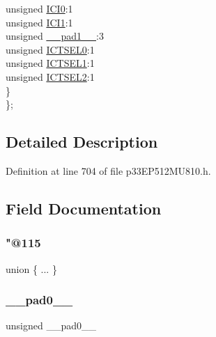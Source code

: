 \begin{DoxyCompactItemize}
\begin{tabbing}
\>\>unsigned \hyperlink{structtag_i_c4_c_o_n1_b_i_t_s_a6f1b5da2706b7c15fc8c9a01a30deaff}{ICI0}:1\\
\>\>unsigned \hyperlink{structtag_i_c4_c_o_n1_b_i_t_s_a7d5c777f0bc43f66f40462f79ed2179c}{ICI1}:1\\
\>\>unsigned \hyperlink{structtag_i_c4_c_o_n1_b_i_t_s_acaf2d0924a107ec6e8d2e31febaf66f9}{\_\_pad1\_\_}:3\\
\>\>unsigned \hyperlink{structtag_i_c4_c_o_n1_b_i_t_s_af6dd4d0e816b18462680d4b22fa926d3}{ICTSEL0}:1\\
\>\>unsigned \hyperlink{structtag_i_c4_c_o_n1_b_i_t_s_aa29140e739d886362537f87d199c4134}{ICTSEL1}:1\\
\>\>unsigned \hyperlink{structtag_i_c4_c_o_n1_b_i_t_s_a47d80892d449e6edbd5ba2ba9ff06deb}{ICTSEL2}:1\\
\>\} \\
\}; \\

\end{tabbing}\end{DoxyCompactItemize}


\subsection{Detailed Description}


Definition at line 704 of file p33\+E\+P512\+M\+U810.\+h.



\subsection{Field Documentation}
\mbox{\label{structtag_i_c4_c_o_n1_b_i_t_s_a8845db0bf3b1a4d873fb669be3ba01e3}} 
\subsubsection{\texorpdfstring{"@115}{@115}}
{\footnotesize\ttfamily union \{ ... \} }

\mbox{\label{structtag_i_c4_c_o_n1_b_i_t_s_adf71f3d8410c1f1dbbc96680a92c49af}} 
\subsubsection{\texorpdfstring{\+\_\+\+\_\+pad0\+\_\+\+\_\+}{\_\_pad0\_\_}}
{\footnotesize\ttfamily unsigned \+\_\+\+\_\+pad0\+\_\+\+\_\+}



